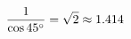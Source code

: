 \documentclass[preview]{standalone}
\begin{document}
\begin{align*}
\special{dvisvgm:raw <g id='unique000'>}\frac{1}{\cos 45^{\circ}} = \sqrt{2} \approx 1.414\special{dvisvgm:raw </g>}
\end{align*}
\end{document}
